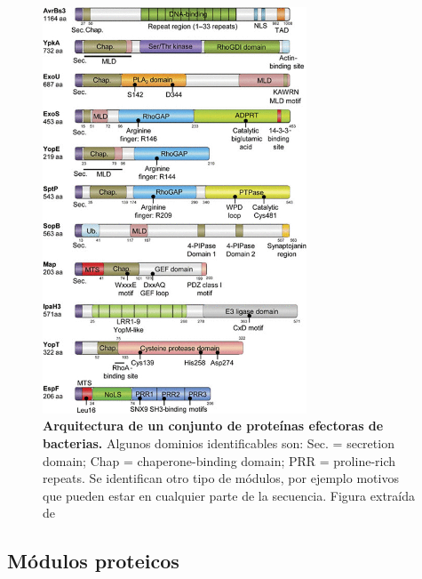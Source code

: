 \begin{figure}[htbp,centered]
\centering
\includegraphics[width=0.7\textwidth]{img/architecture.jpg} 
\caption{\textbf{Arquitectura de un conjunto de proteínas efectoras de bacterias.} Algunos dominios identificables son: Sec. = secretion domain; Chap = chaperone-binding domain; PRR = proline-rich repeats. 
Se identifican otro tipo de módulos, por ejemplo motivos que pueden estar en cualquier parte de la secuencia. Figura extraída de \cite{dean2011functional}} 
\label{arquitectura}
\end{figure}














\subsection{Módulos proteicos} \label{modulosProteicos}
